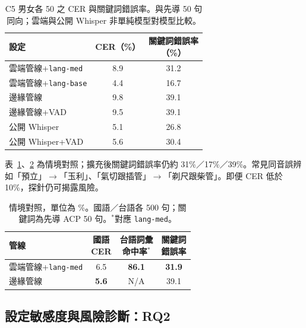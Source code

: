 \documentclass[11pt,a4paper]{article}
\newcommand{\CloudASR}{雲端管線}
\newcommand{\EdgeASR}{邊緣管線}
\newcommand{\LangMVOne}{\texttt{lang-med}}
\newcommand{\LangLegacy}{\texttt{lang-base}}
\begin{document}
\begin{table}[!htbp]
\centering
\footnotesize
\setlength{\tabcolsep}{4pt}
\renewcommand{\arraystretch}{1.05}
\begin{tabular}{@{}lcc@{}}
\toprule
\textbf{設定} & \textbf{CER（\%）} &
\shortstack{\textbf{關鍵詞錯誤率}\\\textbf{（\%）}} \\
\midrule
\CloudASR{}+\LangMVOne{} & 8.9 & 31.2 \\
\CloudASR{}+\LangLegacy{} & 4.4 & 16.7 \\
\EdgeASR{} & 9.8 & 39.1 \\
\EdgeASR{}+VAD & 9.5 & 39.1 \\
公開 Whisper & 5.1 & 26.8 \\
公開 Whisper+VAD & 5.6 & 30.4 \\
\bottomrule
\end{tabular}
\caption{\label{tab:c5_acpdrp} C5 男女各 50 之 CER 與關鍵詞錯誤率。與先導 50 句同向；雲端與公開 Whisper 非單純模型對模型比較。}
\end{table}

表~\ref{tab:c5_acpdrp}、\ref{tab:main} 為情境對照；擴充後關鍵詞錯誤率仍約 31\%／17\%／39\%。常見同音誤辨如「預立」$\rightarrow$「玉利」、「氣切跟插管」$\rightarrow$「剃尺跟柴管」。即便 CER 低於 10\%，探針仍可揭露風險。

\begin{table}[!htbp]
\centering
\footnotesize
\setlength{\tabcolsep}{2.5pt}
\renewcommand{\arraystretch}{1.05}
\begin{tabular}{@{}lccc@{}}
\toprule
\textbf{管線} & \shortstack{\textbf{國語}\\\textbf{CER}} &
\shortstack{\textbf{台語詞彙}\\\textbf{命中率}}$^*$ &
\shortstack{\textbf{關鍵詞}\\\textbf{錯誤率}} \\
\midrule
\CloudASR{}+\LangMVOne{} & 6.5 & \textbf{86.1} & \textbf{31.9} \\
\EdgeASR{} & \textbf{5.6} & N/A & 39.1 \\
\bottomrule
\end{tabular}
\caption{\label{tab:main} 情境對照，單位為 \%。國語／台語各 500 句；關鍵詞為先導 ACP 50 句。$^*$對應 \texttt{lang-med}。}
\end{table}

\subsection{設定敏感度與風險診斷：RQ2}
\end{document}
